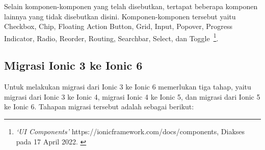 	Selain komponen-komponen yang telah disebutkan, tertapat beberapa komponen lainnya yang tidak disebutkan disini. Komponen-komponen tersebut yaitu Checkbox, Chip, Floating Action Button, Grid, Input, Popover, Progress Indicator, Radio, Reorder, Routing, Searchbar, Select, dan Toggle~\footnote{\textit{`UI Components'} https://ionicframework.com/docs/components, Diakses pada 17 April 2022. \label{ref:uiComponents}}.

\subsection{Migrasi Ionic 3 ke Ionic 6}
\label{subsec:migrasi}

Untuk melakukan migrasi dari Ionic 3 ke Ionic 6 memerlukan tiga tahap, yaitu migrasi dari Ionic 3 ke Ionic 4, migrasi Ionic 4 ke Ionic 5, dan migrasi dari Ionic 5 ke Ionic 6. Tahapan migrasi tersebut adalah sebagai berikut:

